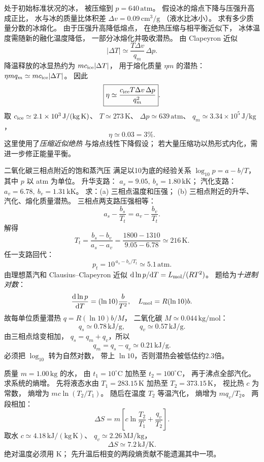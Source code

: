 处于初始标准状况的冰，
被压缩到 $p=640\,\mathrm{atm}$。
假设冰的熔点下降与压强升高成正比，
水与冰的质量比体积差
$\Delta v=0.09\,\mathrm{cm^3/g}$
（液水比冰小）。
求有多少质量分数的冰熔化。
\exsolution
由于压强升高降低熔点，
在绝热压缩与相平衡近似下，
冰体温度需随新的融化温度降低，
一部分冰熔化并吸收潜热。
由 Clapeyron 近似
\[
|\Delta T|\simeq
\frac{T\Delta v}{q_m}\,\Delta p.
\]
降温释放的冰显热约为
$mc_{\rm ice}|\Delta T|$，
用于熔化质量 $\eta m$ 的潜热：
$\eta m q_m\simeq mc_{\rm ice}|\Delta T|$。
因此
\[
\boxed{\eta\simeq
\frac{c_{\rm ice}T\Delta v\,\Delta p}{q_m^2}}.
\]
取
$c_{\rm ice}\simeq2.1\times10^3\,\mathrm{J/(kg\,K)}$、
$T\simeq273\,\mathrm K$、
$\Delta p\simeq639\,\mathrm{atm}$、
$q_m\simeq3.34\times10^5\,\mathrm{J/kg}$，
\[
\boxed{\eta\simeq0.03=3\%}.
\]
\excheck 这里使用了\emph{压缩近似绝热}
与熔点线性下降假设；
若大量压缩功以热形式内化，需进一步修正能量平衡。

二氧化碳三相点附近的饱和蒸汽压
满足以10为底的经验关系
$\log_{10}p=a-b/T$，
其中 $p$ 以 atm 为单位。
升华支路：
$a_s=9.05,\ b_s=1.80\,\mathrm{kK}$；
汽化支路：
$a_v=6.78,\ b_v=1.31\,\mathrm{kK}$。
求：(a) 三相点温度和压强；
(b) 三相点附近的升华、汽化、熔化质量潜热。
\exsolution
三相点两支路压强相等：
\[
a_s-\frac{b_s}{T_t}
=a_v-\frac{b_v}{T_t}.
\]
解得
\[
\boxed{T_t=\frac{b_s-b_v}{a_s-a_v}
=\frac{1800-1310}{9.05-6.78}
\simeq216\,\mathrm K}.
\]
任一支路回代：
\[
\boxed{p_t=10^{\,a_s-b_s/T_t}
\simeq5.1\,\mathrm{atm}}.
\]
由理想蒸汽和 Clausius--Clapeyron 近似
$\mathrm d\ln p/\mathrm dT
=L_{\rm mol}/(RT^2)$。
题给为\emph{十进制对数}：
\[
\frac{\mathrm d\ln p}{\mathrm dT}
=(\ln10)\frac b{T^2},
\quad L_{\rm mol}=R(\ln10)b.
\]
故每单位质量潜热
$q=R(\ln10)b/M$，
二氧化碳 $M\simeq0.044\,\mathrm{kg/mol}$：
\[
\boxed{q_s\simeq0.78\,\mathrm{kJ/g}},\qquad
\boxed{q_v\simeq0.57\,\mathrm{kJ/g}}.
\]
由三相点焓变相加，
$q_s=q_m+q_v$，所以
\[
\boxed{q_m=q_s-q_v\simeq0.21\,\mathrm{kJ/g}}.
\]
\excheck 必须把 $\log_{10}$ 转为自然对数，
带上 $\ln10$，否则潜热会被低估约2.3倍。

质量 $m=1.00\,\mathrm{kg}$ 的水，
由 $t_1=10^\circ\mathrm C$ 加热至
$t_2=100^\circ\mathrm C$，
再于沸点全部汽化。
求系统的熵增。
\exsolution
先将液态水由
$T_1=283.15\,\mathrm K$
加热至
$T_2=373.15\,\mathrm K$，
视比热 $c$ 为常数，
熵增为
$m c\ln(T_2/T_1)$。
随后在温度 $T_2$ 等温汽化，
熵增为
$m q_v/T_2$。
两段相加：
\[
\boxed{\Delta S=
m\left[c\ln\frac{T_2}{T_1}+\frac{q_v}{T_2}\right]}.
\]
取水 $c\simeq4.18\,\mathrm{kJ/(kg\,K)}$、
$q_v\simeq2.26\,\mathrm{MJ/kg}$，
\[
\boxed{\Delta S\simeq7.2\,\mathrm{kJ/K}}.
\]
\excheck 绝对温度必须用 K；
先升温后相变的两段熵贡献不能遗漏其中一项。

